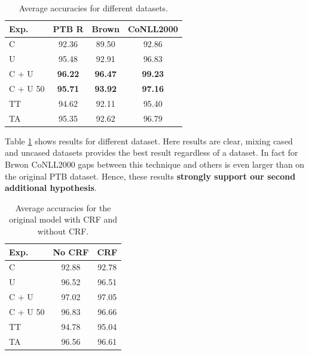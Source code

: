 \documentclass[11pt,a4paper]{article}
\begin{document}
    \begin{table}[h]
        \centering
        \begin{tabular}{|l|c|c|c|}
            \hline
            Exp. & PTB R & Brown & CoNLL2000 \\
            \hline
            C        & 92.36          & 89.50          & 92.86\\
            U        & 95.48          & 92.91          & 96.83 \\
            C + U    & \textbf{96.22} & \textbf{96.47} & \textbf{99.23} \\
            C + U 50 & \textbf{95.71} & \textbf{93.92} & \textbf{97.16} \\
            TT       & 94.62          & 92.11          & 95.40 \\
            TA       & 95.35          & 92.62          & 96.79 \\
            \hline
        \end{tabular}
        \caption{Average accuracies for different datasets.}
        \label{tab:epos-results-datasets}
    \end{table}

    Table \ref{tab:epos-results-datasets} shows results for different dataset. Here results are clear, mixing cased and uncased datasets provides the best result regardless of a dataset. In fact for Brwon CoNLL2000 gaps between this technique and others is even larger than on the original PTB dataset. Hence, these results \textbf{strongly support our second additional hypothesis}.

    \begin{table}[h]
        \centering
        \begin{tabular}{|l|c|c|}
            \hline
            Exp. & No CRF & CRF \\
            \hline
            C        & 92.88 & 92.78 \\
            U        & 96.52 & 96.51 \\
            C + U    & 97.02 & 97.05 \\
            C + U 50 & 96.83 & 96.66 \\
            TT       & 94.78 & 95.04 \\
            TA       & 96.56 & 96.61 \\
            \hline
        \end{tabular}
        \caption{Average accuracies for the original model with CRF and without CRF.}
        \label{tab:epos-results-crf}
    \end{table}
\end{document}
